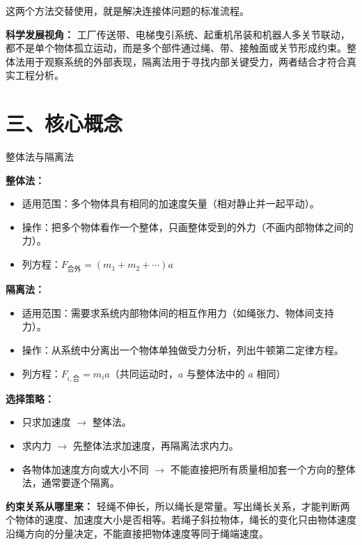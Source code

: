 这两个方法交替使用，就是解决连接体问题的标准流程。

\textbf{科学发展视角：} 工厂传送带、电梯曳引系统、起重机吊装和机器人多关节联动，都不是单个物体孤立运动，而是多个部件通过绳、带、接触面或关节形成约束。整体法用于观察系统的外部表现，隔离法用于寻找内部关键受力，两者结合才符合真实工程分析。

\section*{三、核心概念}

\begin{conceptbox}{整体法与隔离法}

\textbf{整体法：}
\begin{itemize}
  \item 适用范围：多个物体具有相同的加速度矢量（相对静止并一起平动）。
  \item 操作：把多个物体看作一个整体，只画整体受到的外力（不画内部物体之间的力）。
  \item 列方程：$F_{\text{合外}} = (m_1 + m_2 + \cdots) a$
\end{itemize}

\textbf{隔离法：}
\begin{itemize}
  \item 适用范围：需要求系统内部物体间的相互作用力（如绳张力、物体间支持力）。
  \item 操作：从系统中分离出一个物体单独做受力分析，列出牛顿第二定律方程。
  \item 列方程：$F_{i,\text{合}} = m_i a$（共同运动时，$a$ 与整体法中的 $a$ 相同）
\end{itemize}

\textbf{选择策略：}
\begin{itemize}
  \item 只求加速度 $\to$ 整体法。
  \item 求内力 $\to$ 先整体法求加速度，再隔离法求内力。
  \item 各物体加速度方向或大小不同 $\to$ 不能直接把所有质量相加套一个方向的整体法，通常要逐个隔离。
\end{itemize}

\textbf{约束关系从哪里来：} 轻绳不伸长，所以绳长是常量。写出绳长关系，才能判断两个物体的速度、加速度大小是否相等。若绳子斜拉物体，绳长的变化只由物体速度沿绳方向的分量决定，不能直接把物体速度等同于绳端速度。

\pagebreak
\begin{center}


\label{fig:rope-constraint}
\end{center}

\end{conceptbox}

